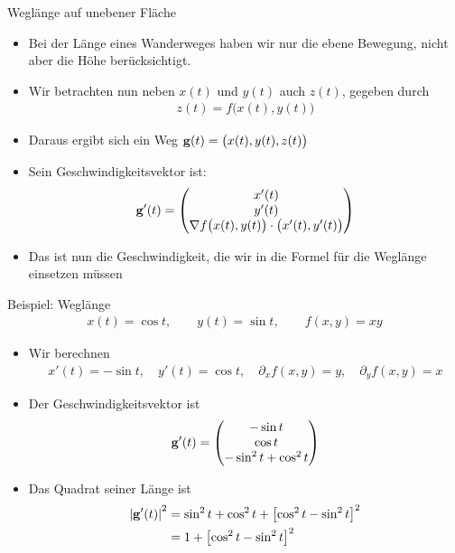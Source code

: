 \begin{frame}{Weglänge auf unebener Fläche}
  \begin{itemize}
  \item Bei der Länge eines Wanderweges haben wir nur die ebene
    Bewegung, nicht aber die Höhe berücksichtigt.
  \item Wir betrachten nun neben $x(t)$ und $y(t)$ auch $z(t)$, gegeben durch
    \begin{gather*}
      z(t) = f\bigl(x(t),y(t)\bigr)
    \end{gather*}
  \item Daraus ergibt sich ein Weg $\mathbf{g}(t) = \bigl(x(t),y(t),z(t)\bigr)$
  \item Sein Geschwindigkeitsvektor ist:
    \begin{gather*}
      \mathbf{g}'(t) =
      \begin{pmatrix}
        x'(t)\\y'(t)\\\nabla f\bigl(x(t),y(t)\bigr)\cdot \bigl(x'(t),y'(t)\bigr)
      \end{pmatrix}
    \end{gather*}
  \item Das ist nun die Geschwindigkeit, die wir in die Formel für die
    Weglänge einsetzen müssen
  \end{itemize}
\end{frame}

\begin{frame}{Beispiel: Weglänge}
  \begin{gather*}
    x(t) = \cos t,\qquad y(t) = \sin t,\qquad f(x,y) = xy
  \end{gather*}
  \begin{itemize}
  \item Wir berechnen
    \begin{gather*}
      x'(t) = -\sin t,\quad y'(t) = \cos t,\quad
      \partial_x f(x,y) = y,\quad
      \partial_y f(x,y) = x
    \end{gather*}
  \item Der Geschwindigkeitsvektor ist
    \begin{gather*}
      \mathbf{g}'(t) =
      \begin{pmatrix}
        -\sin t\\ \cos t\\ -\sin^2 t + \cos^2 t
      \end{pmatrix}
    \end{gather*}
  \item Das Quadrat seiner Länge ist
    \begin{align*}
      \left|\mathbf{g}'(t)\right|^2
      &= \sin^2t+\cos^2t+ \bigl[\cos^2t-\sin^2t\bigr]^2\\
      &= 1+ \bigl[\cos^2t-\sin^2t\bigr]^2
    \end{align*}
  \end{itemize}
\end{frame}

